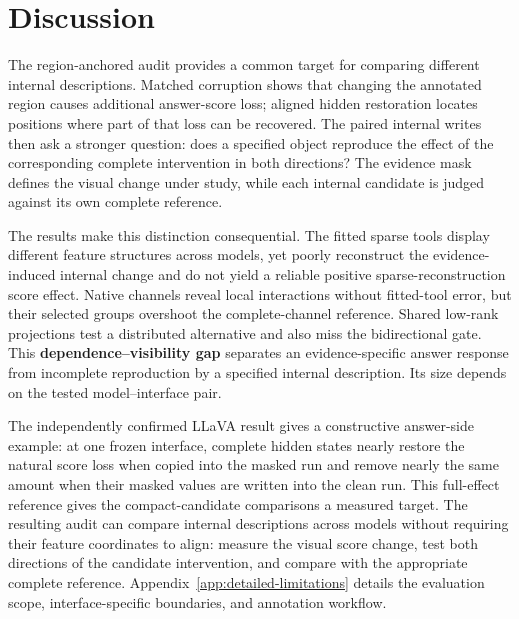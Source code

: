 \section{Discussion}

The region-anchored audit provides a common target for comparing different internal descriptions. Matched corruption shows that changing the annotated region causes additional answer-score loss; aligned hidden restoration locates positions where part of that loss can be recovered. The paired internal writes then ask a stronger question: does a specified object reproduce the effect of the corresponding complete intervention in both directions? The evidence mask defines the visual change under study, while each internal candidate is judged against its own complete reference.

The results make this distinction consequential. The fitted sparse tools display different feature structures across models, yet poorly reconstruct the evidence-induced internal change and do not yield a reliable positive sparse-reconstruction score effect. Native channels reveal local interactions without fitted-tool error, but their selected groups overshoot the complete-channel reference. Shared low-rank projections test a distributed alternative and also miss the bidirectional gate. This \textbf{dependence--visibility gap} separates an evidence-specific answer response from incomplete reproduction by a specified internal description. Its size depends on the tested model--interface pair.

The independently confirmed LLaVA result gives a constructive answer-side example: at one frozen interface, complete hidden states nearly restore the natural score loss when copied into the masked run and remove nearly the same amount when their masked values are written into the clean run. This full-effect reference gives the compact-candidate comparisons a measured target. The resulting audit can compare internal descriptions across models without requiring their feature coordinates to align: measure the visual score change, test both directions of the candidate intervention, and compare with the appropriate complete reference. Appendix~\ref{app:detailed-limitations} details the evaluation scope, interface-specific boundaries, and annotation workflow.
